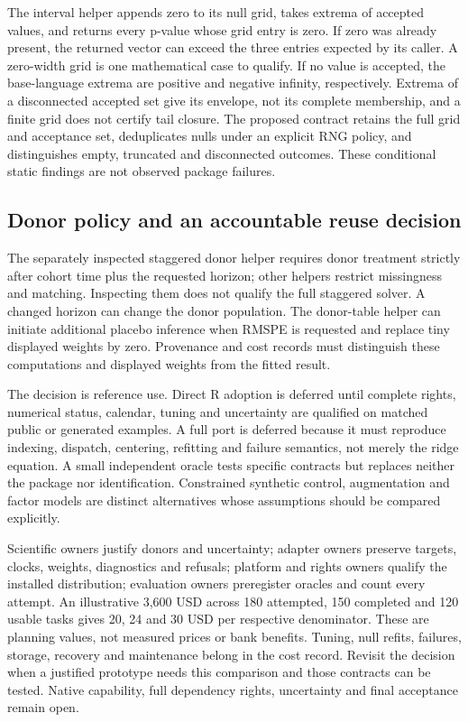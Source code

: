 The interval helper appends zero to its null grid, takes extrema of accepted
values, and returns every p-value whose grid entry is zero. If zero was
already present, the returned vector can exceed the three entries expected
by its caller. A zero-width grid is one mathematical case to qualify. If
no value is accepted, the base-language extrema are positive and negative
infinity, respectively. Extrema of a disconnected accepted set give its
envelope, not its complete membership, and a finite grid does not certify
tail closure. The proposed contract retains the full grid and acceptance
set, deduplicates nulls under an explicit RNG policy, and distinguishes
empty, truncated and disconnected outcomes. These conditional static
findings are not observed package failures.
\citep{exec24_augsynth_source,exec24_augsynth_choice}

\subsection{Donor policy and an accountable reuse decision}
The separately inspected staggered donor helper requires donor treatment
strictly after cohort time plus the requested horizon; other helpers
restrict missingness and matching. Inspecting them does not qualify the
full staggered solver. A changed horizon can change the donor population.
The donor-table helper can initiate additional placebo inference when RMSPE
is requested and replace tiny displayed weights by zero. Provenance and
cost records must distinguish these computations and displayed weights
from the fitted result.\citep{exec24_augsynth_source}

The decision is reference use. Direct R adoption is deferred until complete
rights, numerical status, calendar, tuning and uncertainty are qualified
on matched public or generated examples. A full port is deferred because
it must reproduce indexing, dispatch, centering, refitting and failure
semantics, not merely the ridge equation. A small independent oracle tests
specific contracts but replaces neither the package nor identification.
Constrained synthetic control, augmentation and factor models are distinct
alternatives whose assumptions should be compared explicitly.
\citep{exec24_augsynth_choice}

Scientific owners justify donors and uncertainty; adapter owners preserve
targets, clocks, weights, diagnostics and refusals; platform and rights
owners qualify the installed distribution; evaluation owners preregister
oracles and count every attempt. An illustrative 3,600 USD across 180
attempted, 150 completed and 120 usable tasks gives 20, 24 and 30 USD per
respective denominator. These are planning values, not measured prices or
bank benefits. Tuning, null refits, failures, storage, recovery and
maintenance belong in the cost record. Revisit the decision when a
justified prototype needs this comparison and those contracts can be
tested. Native capability, full dependency rights, uncertainty and final
acceptance remain open.\citep{exec24_augsynth_choice}
